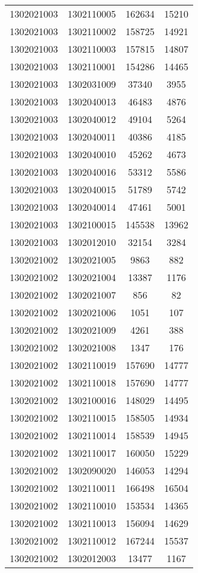 \begin{longtable}{llcc}
1302021003 & 1302110005 & 162634 & 15210\\
1302021003 & 1302110002 & 158725 & 14921\\
1302021003 & 1302110003 & 157815 & 14807\\
1302021003 & 1302110001 & 154286 & 14465\\
1302021003 & 1302031009 & 37340 & 3955\\
1302021003 & 1302040013 & 46483 & 4876\\
1302021003 & 1302040012 & 49104 & 5264\\
1302021003 & 1302040011 & 40386 & 4185\\
1302021003 & 1302040010 & 45262 & 4673\\
1302021003 & 1302040016 & 53312 & 5586\\
1302021003 & 1302040015 & 51789 & 5742\\
1302021003 & 1302040014 & 47461 & 5001\\
1302021003 & 1302100015 & 145538 & 13962\\
1302021003 & 1302012010 & 32154 & 3284\\
1302021002 & 1302021005 & 9863 & 882\\
1302021002 & 1302021004 & 13387 & 1176\\
1302021002 & 1302021007 & 856 & 82\\
1302021002 & 1302021006 & 1051 & 107\\
1302021002 & 1302021009 & 4261 & 388\\
1302021002 & 1302021008 & 1347 & 176\\
1302021002 & 1302110019 & 157690 & 14777\\
1302021002 & 1302110018 & 157690 & 14777\\
1302021002 & 1302100016 & 148029 & 14495\\
1302021002 & 1302110015 & 158505 & 14934\\
1302021002 & 1302110014 & 158539 & 14945\\
1302021002 & 1302110017 & 160050 & 15229\\
1302021002 & 1302090020 & 146053 & 14294\\
1302021002 & 1302110011 & 166498 & 16504\\
1302021002 & 1302110010 & 153534 & 14365\\
1302021002 & 1302110013 & 156094 & 14629\\
1302021002 & 1302110012 & 167244 & 15537\\
1302021002 & 1302012003 & 13477 & 1167\\

\end{longtable}
